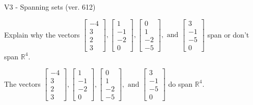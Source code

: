 \begin{exercise}
  \begin{exerciseTitle}V3 - Spanning sets (ver. 612)\end{exerciseTitle}
  \begin{exerciseStatement}
    Explain why the vectors \(\left[\begin{array}{r}
-4 \\
3 \\
2 \\
3
\end{array}\right] , \left[\begin{array}{r}
1 \\
-1 \\
-2 \\
0
\end{array}\right] , \left[\begin{array}{r}
0 \\
1 \\
-2 \\
-5
\end{array}\right] , \text{ and } \left[\begin{array}{r}
3 \\
-1 \\
-5 \\
0
\end{array}\right]\) span or don't span \(\mathbb{R}^4\). 
	


  \end{exerciseStatement}
  \begin{exerciseAnswer}
   The vectors \(\left[\begin{array}{r}
-4 \\
3 \\
2 \\
3
\end{array}\right] , \left[\begin{array}{r}
1 \\
-1 \\
-2 \\
0
\end{array}\right] , \left[\begin{array}{r}
0 \\
1 \\
-2 \\
-5
\end{array}\right] , \text{ and } \left[\begin{array}{r}
3 \\
-1 \\
-5 \\
0
\end{array}\right]\) 
  	 do  
	span \(\mathbb{R}^4\).
  


  \end{exerciseAnswer}
\end{exercise}